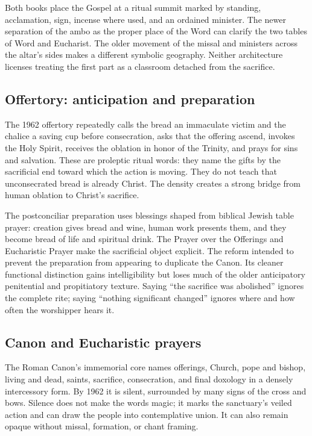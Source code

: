 Both books place the Gospel at a ritual summit marked by standing, acclamation, sign, incense where used, and an ordained minister. The newer separation of the ambo as the proper place of the Word can clarify the two tables of Word and Eucharist. The older movement of the missal and ministers across the altar's sides makes a different symbolic geography. Neither architecture licenses treating the first part as a classroom detached from the sacrifice.

\subsection{Offertory: anticipation and preparation}

The 1962 offertory repeatedly calls the bread an immaculate victim and the chalice a saving cup before consecration, asks that the offering ascend, invokes the Holy Spirit, receives the oblation in honor of the Trinity, and prays for sins and salvation. These are proleptic ritual words: they name the gifts by the sacrificial end toward which the action is moving. They do not teach that unconsecrated bread is already Christ. The density creates a strong bridge from human oblation to Christ's sacrifice.

The postconciliar preparation uses blessings shaped from biblical Jewish table prayer: creation gives bread and wine, human work presents them, and they become bread of life and spiritual drink. The Prayer over the Offerings and Eucharistic Prayer make the sacrificial object explicit. The reform intended to prevent the preparation from appearing to duplicate the Canon. Its cleaner functional distinction gains intelligibility but loses much of the older anticipatory penitential and propitiatory texture. Saying “the sacrifice was abolished” ignores the complete rite; saying “nothing significant changed” ignores where and how often the worshipper hears it.

\subsection{Canon and Eucharistic prayers}

The Roman Canon's immemorial core names offerings, Church, pope and bishop, living and dead, saints, sacrifice, consecration, and final doxology in a densely intercessory form. By 1962 it is silent, surrounded by many signs of the cross and bows. Silence does not make the words magic; it marks the sanctuary's veiled action and can draw the people into contemplative union. It can also remain opaque without missal, formation, or chant framing.

